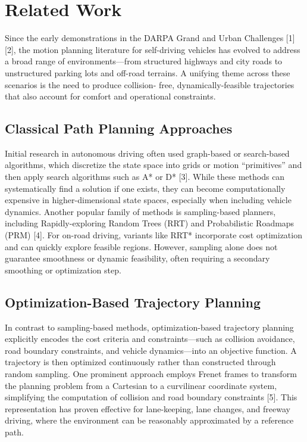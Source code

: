\section{Related Work} \label{sec:related_work}

Since the early demonstrations in the DARPA Grand and Urban Challenges [1][2], the motion planning literature for self-driving vehicles has evolved
to address a broad range of environments—from structured highways and city roads to unstructured parking lots and off-road terrains.
A unifying theme across these scenarios is the need to produce collision- free, dynamically-feasible trajectories that also account for comfort and
operational constraints.

\subsection{Classical Path Planning Approaches}
Initial research in autonomous driving often used graph-based or search-based algorithms, which discretize the state space into grids or motion
“primitives” and then apply search algorithms such as A* or D* [3].
While these methods can systematically find a solution if one exists, they can become computationally expensive in higher-dimensional state spaces,
especially when including vehicle dynamics.
Another popular family of methods is sampling-based planners, including Rapidly-exploring Random Trees (RRT) and Probabilistic Roadmaps (PRM) [4].
For on-road driving, variants like RRT* incorporate cost optimization and can quickly explore feasible regions.
However, sampling alone does not guarantee smoothness or dynamic feasibility, often requiring a secondary smoothing or optimization step.

\subsection{Optimization-Based Trajectory Planning}
In contrast to sampling-based methods, optimization-based trajectory planning explicitly encodes the cost criteria and constraints—such as collision
avoidance, road boundary constraints, and vehicle dynamics—into an objective function.
A trajectory is then optimized continuously rather than constructed through random sampling.
One prominent approach employs Frenet frames to transform the planning problem from a Cartesian to a curvilinear coordinate system, simplifying the
computation of collision and road boundary constraints [5].
This representation has proven effective for lane-keeping, lane changes, and freeway driving, where the environment can be reasonably approximated by
a reference path.

